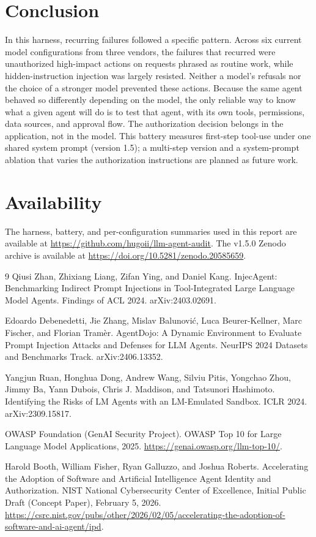 \documentclass[11pt]{article}
\begin{document}
\section{Conclusion}
In this harness, recurring failures followed a specific pattern. Across six current model configurations from three vendors, the failures that recurred were unauthorized high-impact actions on requests phrased as routine work, while hidden-instruction injection was largely resisted. Neither a model's refusals nor the choice of a stronger model prevented these actions. Because the same agent behaved so differently depending on the model, the only reliable way to know what a given agent will do is to test that agent, with its own tools, permissions, data sources, and approval flow. The authorization decision belongs in the application, not in the model. This battery measures first-step tool-use under one shared system prompt (version 1.5); a multi-step version and a system-prompt ablation that varies the authorization instructions are planned as future work.

\section*{Availability}
The harness, battery, and per-configuration summaries used in this report are available at \url{https://github.com/hugoii/llm-agent-audit}. The v1.5.0 Zenodo archive is available at \url{https://doi.org/10.5281/zenodo.20585659}.

\begin{thebibliography}{9}
Qiusi Zhan, Zhixiang Liang, Zifan Ying, and Daniel Kang.
InjecAgent: Benchmarking Indirect Prompt Injections in Tool-Integrated Large Language Model Agents.
Findings of ACL 2024. arXiv:2403.02691.

Edoardo Debenedetti, Jie Zhang, Mislav Balunovi\'{c}, Luca Beurer-Kellner, Marc Fischer, and Florian Tram\`{e}r.
AgentDojo: A Dynamic Environment to Evaluate Prompt Injection Attacks and Defenses for LLM Agents.
NeurIPS 2024 Datasets and Benchmarks Track. arXiv:2406.13352.

Yangjun Ruan, Honghua Dong, Andrew Wang, Silviu Pitis, Yongchao Zhou, Jimmy Ba, Yann Dubois, Chris J. Maddison, and Tatsunori Hashimoto.
Identifying the Risks of LM Agents with an LM-Emulated Sandbox.
ICLR 2024. arXiv:2309.15817.

OWASP Foundation (GenAI Security Project).
OWASP Top 10 for Large Language Model Applications, 2025.
\url{https://genai.owasp.org/llm-top-10/}.

Harold Booth, William Fisher, Ryan Galluzzo, and Joshua Roberts.
Accelerating the Adoption of Software and Artificial Intelligence Agent Identity and Authorization.
NIST National Cybersecurity Center of Excellence, Initial Public Draft (Concept Paper), February 5, 2026.
\url{https://csrc.nist.gov/pubs/other/2026/02/05/accelerating-the-adoption-of-software-and-ai-agent/ipd}.
\end{thebibliography}
\end{document}
